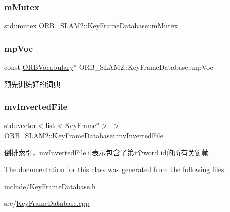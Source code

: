 \subsubsection{\texorpdfstring{m\+Mutex}{mMutex}}
{\footnotesize\ttfamily std\+::mutex O\+R\+B\+\_\+\+S\+L\+A\+M2\+::\+Key\+Frame\+Database\+::m\+Mutex\hspace{0.3cm}{\ttfamily [protected]}}

\mbox{\label{class_o_r_b___s_l_a_m2_1_1_key_frame_database_ad11a653313a5f0ef6f6fbc4880df0b7d}} 
\subsubsection{\texorpdfstring{mp\+Voc}{mpVoc}}
{\footnotesize\ttfamily const \mbox{\hyperlink{namespace_o_r_b___s_l_a_m2_a2fafba714858cab1bb18d438e2e83c5d}{O\+R\+B\+Vocabulary}}$\ast$ O\+R\+B\+\_\+\+S\+L\+A\+M2\+::\+Key\+Frame\+Database\+::mp\+Voc\hspace{0.3cm}{\ttfamily [protected]}}



预先训练好的词典 

\mbox{\label{class_o_r_b___s_l_a_m2_1_1_key_frame_database_a3b6d73823fcd1b96f3ba5a66be0b2227}} 
\subsubsection{\texorpdfstring{mv\+Inverted\+File}{mvInvertedFile}}
{\footnotesize\ttfamily std\+::vector$<$list$<$\mbox{\hyperlink{class_o_r_b___s_l_a_m2_1_1_key_frame}{Key\+Frame}}$\ast$$>$ $>$ O\+R\+B\+\_\+\+S\+L\+A\+M2\+::\+Key\+Frame\+Database\+::mv\+Inverted\+File\hspace{0.3cm}{\ttfamily [protected]}}



倒排索引，mv\+Inverted\+File\mbox{[}i\mbox{]}表示包含了第i个word id的所有关键帧 



The documentation for this class was generated from the following files\+:\begin{DoxyCompactItemize}
\item 
include/\mbox{\hyperlink{_key_frame_database_8h}{Key\+Frame\+Database.\+h}}\item 
src/\mbox{\hyperlink{_key_frame_database_8cpp}{Key\+Frame\+Database.\+cpp}}\end{DoxyCompactItemize}
